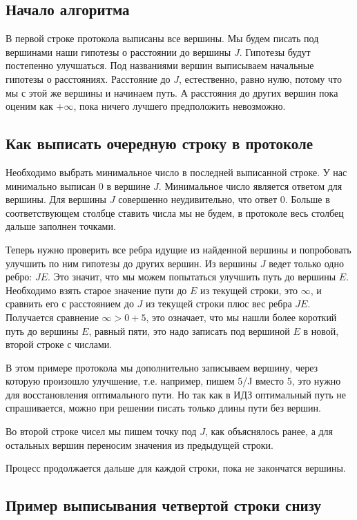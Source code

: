 \documentclass{article}
\begin{document}
\subsection{Начало алгоритма}
В первой строке протокола выписаны все вершины. Мы будем писать под вершинами наши гипотезы о расстоянии до вершины $J$. Гипотезы будут постепенно улучшаться. Под названиями вершин выписываем начальные гипотезы о расстояниях. Расстояние до $J$, естественно, равно нулю, потому что мы с этой же вершины и начинаем путь. А расстояния до других вершин пока оценим как $+\infty$, пока ничего лучшего предположить невозможно.

\subsection{Как выписать очередную строку в протоколе}
Необходимо выбрать минимальное число в последней выписанной строке. У нас минимально выписан 0 в вершине $J$. Минимальное число является ответом для вершины. Для вершины $J$ совершенно неудивительно, что ответ 0. Больше в соответствующем столбце ставить числа мы не будем, в протоколе весь столбец дальше заполнен точками.

Теперь нужно проверить все ребра идущие из найденной вершины и попробовать улучшить по ним гипотезы до других вершин. Из вершины $J$ ведет только одно ребро: $JE$. Это значит, что мы можем попытаться улучшить путь до вершины $E$. Необходимо взять старое значение пути до $E$ из текущей строки, это $\infty$, и сравнить его с расстоянием до $J$ из текущей строки плюс вес ребра $JE$. Получается сравнение $\infty > 0 + 5$, это означает, что мы нашли более короткий путь до вершины $E$, равный пяти, это надо записать под вершиной $E$ в новой, второй строке с числами.

В этом примере протокола мы дополнительно записываем вершину, через которую произошло улучшение, т.е. например, пишем 5/J вместо 5, это нужно для восстановления оптимального пути. Но так как в ИДЗ оптимальный путь не спрашивается, можно при решении писать только длины пути без вершин.

Во второй строке чисел мы пишем точку под $J$, как объяснялось ранее, а для остальных вершин переносим значения из предыдущей строки.

Процесс продолжается дальше для каждой строки, пока не закончатся вершины.

\subsection{Пример выписывания четвертой строки снизу}
\end{document}
